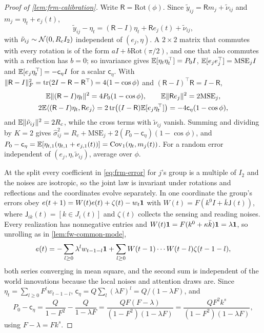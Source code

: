 \begin{proof}[Proof of \cref{lem:frm-calibration}]
Write $\mathsf R=\mathrm{Rot}(\phi)$. Since $\tilde y_{ij}=\mathsf Rm_j+\tilde\nu_{ij}$ and $m_j=\eta_t+e_j(t)$,
\begin{equation*}
\tilde y_{ij}-\eta_t=(\mathsf R-I)\eta_t+\mathsf Re_j(t)+\tilde\nu_{ij},
\end{equation*}
with $\tilde\nu_{ij}\sim\mathcal{N}(0,R_cI_2)$ independent of $(e_j,\eta)$. A $2\times2$ matrix that commutes with every rotation is of the form $aI+b\mathrm{Rot}(\pi/2)$, and one that also commutes with a reflection has $b=0$; so invariance gives $\mathbb{E}[\eta_t\eta_t^\top]=P_0I$, $\mathbb{E}[e_je_j^\top]=\mathrm{MSE}_jI$ and $\mathbb{E}[e_j\eta_t^\top]=-\mathsf c_\eta I$ for a scalar $\mathsf c_\eta$. With $\Vert\mathsf R-I\Vert_F^2=\operatorname{tr}(2I-\mathsf R-\mathsf R^\top)=4(1-\cos\phi)$ and $(\mathsf R-I)^\top\mathsf R=I-\mathsf R$,
\begin{gather*}
\mathbb{E}\Vert(\mathsf R-I)\eta_t\Vert^2=4P_0(1-\cos\phi),\qquad\mathbb{E}\Vert\mathsf Re_j\Vert^2=2\mathrm{MSE}_j,\\
2\mathbb{E}\langle(\mathsf R-I)\eta_t,\mathsf Re_j\rangle=2\operatorname{tr}\bigl((I-\mathsf R)\mathbb{E}[e_j\eta_t^\top]\bigr)=-4\mathsf c_\eta(1-\cos\phi),
\end{gather*}
and $\mathbb{E}\Vert\tilde\nu_{ij}\Vert^2=2R_c$, while the cross terms with $\tilde\nu_{ij}$ vanish. Summing and dividing by $K=2$ gives $\hat\sigma^2_{ij}=R_c+\mathrm{MSE}_j+2(P_0-\mathsf c_\eta)(1-\cos\phi)$, and $P_0-\mathsf c_\eta=\mathbb{E}[\eta_{t,1}(\eta_{t,1}+e_{j,1}(t))]=\operatorname{Cov}_1(\eta_t,m_j(t))$. For a random error independent of $(e_j,\eta,\tilde\nu_{ij})$, average over $\phi$.

At the split every coefficient in \eqref{eq:frm-error} for $j$'s group is a multiple of $I_2$ and the noises are isotropic, so the joint law is invariant under rotations and reflections and the coordinates evolve separately. In one coordinate the group's errors obey $e(t+1)=W(t)e(t)+\zeta(t)-w_t\mathbf{1}$ with $W(t)=F(k^0I+\bar k\mathsf J(t))$, where $\mathsf J_{ik}(t)=[k\in J_i(t)]$ and $\zeta(t)$ collects the sensing and reading noises. Every realization has nonnegative entries and $W(t)\mathbf{1}=F(k^0+\kappa\bar k)\mathbf{1}=\lambda\mathbf{1}$, so unrolling as in \cref{lem:fw-common-mode},
\begin{equation*}
e(t)=-\sum_{l\ge0}\lambda^lw_{t-1-l}\mathbf{1}+\sum_{l\ge0}W(t-1)\cdots W(t-l)\zeta(t-1-l),
\end{equation*}
both series converging in mean square, and the second sum is independent of the world innovations because the local noises and attention draws are. Since $\eta_t=\sum_{l\ge0}F^lw_{t-1-l}$, $\mathsf c_\eta=Q\sum_l(\lambda F)^l=Q/(1-\lambda F)$, and
\begin{equation*}
P_0-\mathsf c_\eta=\frac{Q}{1-F^2}-\frac{Q}{1-\lambda F}=\frac{QF(F-\lambda)}{(1-F^2)(1-\lambda F)}=\frac{QF^2k^s}{(1-F^2)(1-\lambda F)},
\end{equation*}
using $F-\lambda=Fk^s$.
\end{proof}

